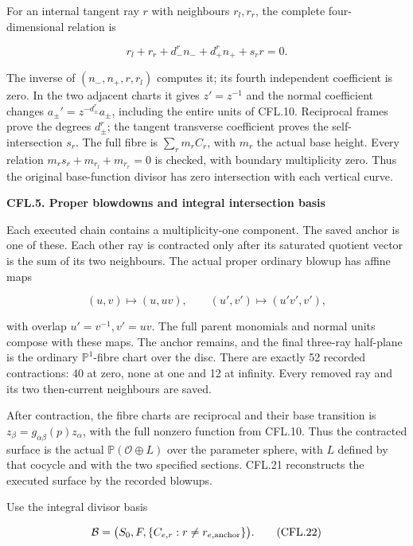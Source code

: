 For an internal tangent ray \(r\) with neighbours \(r_l,r_r\),
the complete four-dimensional relation is

\[
 r_l+r_r+d_-^r n_-+d_+^r n_+ + s_r r=0.
 \tag{CFL.20}
\]

The inverse of \((n_-,n_+,r,r_l)\) computes it; its fourth
independent coefficient is zero. In the two adjacent
charts it gives \(z'=z^{-1}\) and the normal coefficient
changes \(a_\pm'=z^{-d_\pm^r}a_\pm\), including the entire
units of CFL.10. Reciprocal frames prove the degrees
\(d_\pm^r\); the tangent transverse coefficient proves
the self-intersection \(s_r\). The full fibre is
\(\sum_r m_r C_r\), with \(m_r\) the actual base height.
Every relation \(m_rs_r+m_{r_l}+m_{r_r}=0\) is checked,
with boundary multiplicity zero. Thus the original
base-function divisor has zero intersection with each
vertical curve.

\par

\medskip\noindent\textbf{CFL.5. Proper blowdowns and integral intersection basis}

\par\nobreak

Each executed chain contains a multiplicity-one component.
The saved anchor is one of these. Each other ray is
contracted only after its saturated quotient vector is
the sum of its two neighbours. The actual proper
ordinary blowup has affine maps

\[
       (u,v)\mapsto(u,uv),\qquad
       (u',v')\mapsto(u'v',v'),
 \tag{CFL.21}
\]

with overlap \(u'=v^{-1},v'=uv\). The full parent
monomials and normal units compose with these maps.
The anchor remains, and the final three-ray half-plane
is the ordinary \(\mathbb P^1\)-fibre chart over the disc.
There are exactly 52 recorded contractions: 40 at zero,
none at one and 12 at infinity. Every removed ray and
its two then-current neighbours are saved.

After contraction, the fibre charts are reciprocal and
their base transition is \(z_\beta=g_{\alpha\beta}(p)z_\alpha\),
with the full nonzero function from CFL.10. Thus the
contracted surface is the actual
\(\mathbb P(\mathcal O\oplus L)\) over the parameter sphere,
with \(L\) defined by that cocycle and with the two
specified sections. CFL.21 reconstructs the executed
surface by the recorded blowups.

Use the integral divisor basis

\[
 \mathcal B=\bigl(S_0,F,\{C_{e,r}:r\ne r_{e,\rm anchor}\}\bigr).
 \tag{CFL.22}
\]

